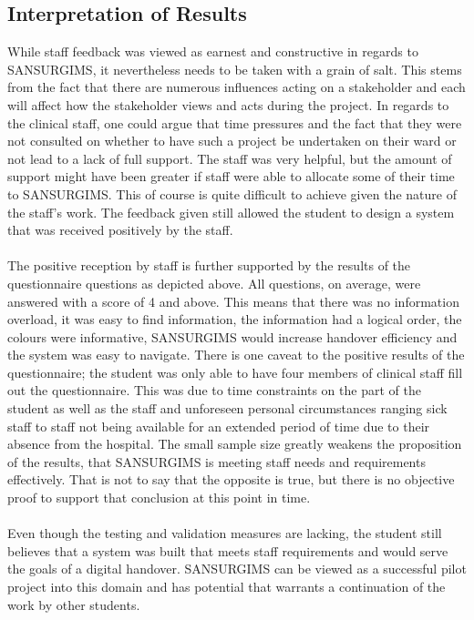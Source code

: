 \subsection{Interpretation of Results}
While staff feedback was viewed as earnest and constructive in regards to SANSURGIMS, it nevertheless needs to be taken with a grain of salt. This stems from the fact that there are numerous influences acting on a stakeholder and each will affect how the stakeholder views and acts during the project. In regards to the clinical staff, one could argue that time pressures and the fact that they were not consulted on whether to have such a project be undertaken on their ward or not lead to a lack of full support. The staff was very helpful, but the amount of support might have been greater if staff were able to allocate some of their time to SANSURGIMS. This of course is quite difficult to achieve given the nature of the staff's work. The feedback given still allowed the student to design a system that was received positively by the staff.
\\ \\
The positive reception by staff is further supported by the results of the questionnaire questions as depicted above. All questions, on average, were answered with a score of 4 and above. This means that there was no information overload, it was easy to find information, the information had a logical order, the colours were informative, SANSURGIMS would increase handover efficiency and the system was easy to navigate. There is one caveat to the positive results of the questionnaire; the student was only able to have four members of clinical staff fill out the questionnaire. This was due to time constraints on the part of the student as well as the staff and unforeseen personal circumstances ranging sick staff to staff not being available for an extended period of time due to their absence from the hospital. The small sample size greatly weakens the proposition of the results, that SANSURGIMS is meeting staff needs and requirements effectively. That is not to say that the opposite is true, but there is no objective proof to support that conclusion at this point in time. 
\\ \\
Even though the testing and validation measures are lacking, the student still believes that a system was built that meets staff requirements and would serve the goals of a digital handover. SANSURGIMS can be viewed as a successful pilot project into this domain and has potential that warrants a continuation of the work by other students.
